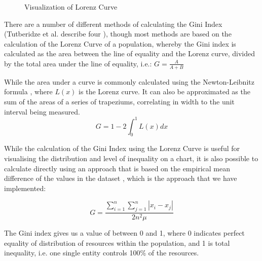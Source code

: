 \documentclass[conference]{IEEEtran}
\begin{document}
\begin{figure}[h]


\caption{Visualization of Lorenz Curve}
\label{fig:lorenz-curve-graph}
\end{figure}


There are a number of different methods of calculating the Gini Index (Tutberidze et al. describe four \cite{tutberidze2018measuring}), though most methods are based on the calculation of the Lorenz Curve of a population, whereby the Gini index is calculated as the area between the line of equality and the Lorenz curve, divided by the total area under the line of equality, i.e.: \(G=\frac{A}{A+B}\)

While the area under a curve is commonly calculated using the Newton-Leibnitz formula \cite{kalinski2016} , where $L(x)$ is the Lorenz curve.  It can also be approximated as the sum of the areas of a series of trapeziums, correlating in width to the unit interval being measured. 
\[G=1-2\int_{0}^{1}L\left( x \right)dx\]
\vspace{1pt}

While the calculation of the Gini Index using the Lorenz Curve is useful for visualising the distribution and level of inequality on a chart, it is also possible to calculate directly using an approach that is based on the empirical mean difference of the values in the dataset \cite{gastwirth1972estimation}, which is the approach that we have implemented:

\[G=\frac{\sum_{i=1}^{n}\sum_{j=1}^{n}\left| x_i - x_j \right|}{2n^2\mu}\]

\vspace{4pt}

The Gini index gives us a value of between 0 and 1, where 0 indicates perfect equality of distribution of resources within the population, and 1 is total inequality, i.e. one single entity controls 100\% of the resources.
\end{document}
